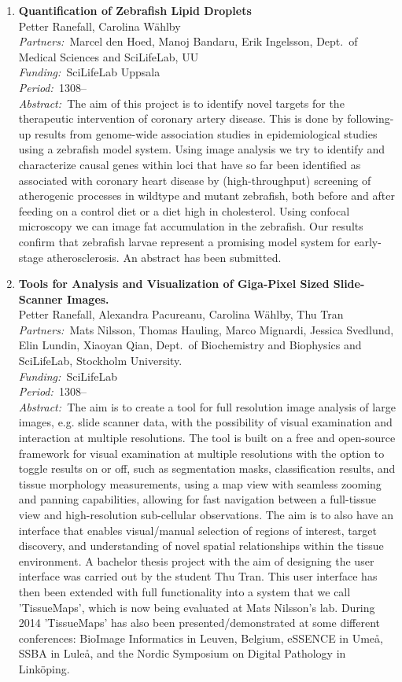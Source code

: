 \documentclass[10pt, a4paper]{article}
\newcommand{\aabstract}[1]{\emph{Abstract:~}#1}
\newcommand{\ffunding}[1]{\emph{Funding:~}#1\\}
\newcommand{\ppartners}[1]{\emph{Partners:~}#1\\}
\newcommand{\pperiod}[1]{\emph{Period:~}#1\\}
\begin{document}
{\begin{enumerate}
\item 
\textbf{Quantification of Zebrafish Lipid Droplets}\\
Petter Ranefall, Carolina W\"{a}hlby\\
\ppartners{Marcel den Hoed, Manoj Bandaru, Erik Ingelsson, Dept.~of Medical Sciences and SciLifeLab, UU}
\ffunding{SciLifeLab Uppsala}
\pperiod{1308--}
\aabstract{The aim of this project is to identify novel targets for the therapeutic intervention of coronary artery disease. This is done by following-up results from genome-wide association studies in epidemiological studies using a zebrafish model system. Using image analysis we try to identify and characterize causal genes within loci that have so far been identified as associated with coronary heart disease by (high-throughput) screening of atherogenic processes in wildtype and mutant zebrafish, both before and after feeding on a control diet or a diet high in cholesterol. Using confocal microscopy we can image fat accumulation in the zebrafish. Our results confirm that zebrafish larvae represent a promising model system for early-stage atherosclerosis. An abstract has been submitted.}




\item
\label{proj:gigapixel}
\textbf{Tools for Analysis and Visualization of Giga-Pixel Sized  Slide-Scanner Images.}\\
Petter Ranefall, Alexandra Pacureanu, Carolina W\"{a}hlby, Thu Tran\\
\ppartners{Mats Nilsson, Thomas Hauling, Marco Mignardi, Jessica Svedlund, Elin Lundin, Xiaoyan Qian, Dept.~of Biochemistry and Biophysics and SciLifeLab, Stockholm University.}
\ffunding{SciLifeLab}
\pperiod{1308--}
\aabstract{The aim is to create a tool for full resolution image analysis of large images, e.g. slide scanner data, with the possibility of visual examination and interaction at multiple resolutions. The tool is built on a free and open-source framework for visual examination at multiple resolutions with the option to toggle results on or off, such as segmentation masks, classification results, and tissue morphology measurements, using a map view with seamless zooming and panning capabilities, allowing for fast navigation between a full-tissue view and high-resolution sub-cellular observations. The aim is to also have an interface that enables visual/manual selection of regions of interest, target discovery, and understanding of novel spatial relationships within the tissue environment. A bachelor thesis project with the aim of designing the user interface was carried out by the student Thu Tran. This user interface has then been extended with full functionality into a system that we call 'TissueMaps', which is now being evaluated at Mats Nilsson's lab. During 2014 'TissueMaps' has also been presented/demonstrated at some different conferences: BioImage Informatics in Leuven, Belgium, eSSENCE in Ume\aa, SSBA in Lule\aa, and the Nordic Symposium on Digital Pathology in Link\"oping.}


\end{enumerate}}
\end{document}
